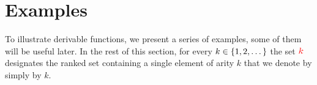 
\section{Examples}\label{sec:AppendixExamples}

%
%
%    
%
To illustrate derivable functions, we present a series of examples, some of them will be useful later. In the rest of this section, for every $k\in\{1,2,\dots\}$ the set ${\color{red}{k}}$ designates the ranked set containing a single element of arity $k$ that we denote by simply by $k$.  


